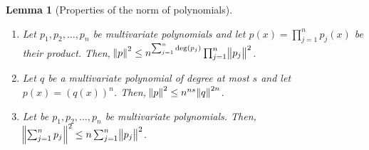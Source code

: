 \documentclass[12pt]{article}
\newtheorem{lemma}[definition]{Lemma}
\begin{document}
\begin{lemma}[Properties of the norm of polynomials]
\label{lemma:properties-of-norm-of-polynomials}
\hspace{1cm} %
\begin{enumerate}
\item Let $p_1, p_2, \dots, p_n$ be multivariate polynomials and let $p(x) =
\prod_{j=1}^n p_j(x)$ be their product.  Then, $\norm{p}^2 \le n^{\sum_{j=1}^n
\deg(p_j)} \prod_{j=1}^n \norm{p_j}^2$.

\item Let $q$ be a multivariate polynomial of degree at most $s$ and let $p(x) =
(q(x))^n$. Then, $\norm{p}^2 \le n^{ns} \norm{q}^{2n}$.

\item Let be $p_1, p_2, \dots, p_n$ be multivariate polynomials. Then,
$\norm{\sum_{j=1}^n p_j}^2 \le n \sum_{j=1}^n \norm{p_j}^2$.
\end{enumerate}
\end{lemma}
\end{document}
